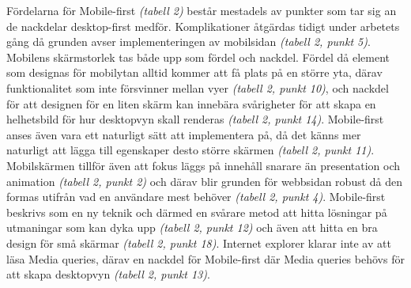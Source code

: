 \documentclass[11pt]{article}
\begin{document}
Fördelarna för Mobile-first \textit{(tabell 2)} består mestadels av punkter som tar sig an de nackdelar desktop-first medför. Komplikationer åtgärdas tidigt under arbetets gång då grunden avser implementeringen av mobilsidan \textit{(tabell 2, punkt 5)}. Mobilens skärmstorlek tas både upp som fördel och nackdel. Fördel då element som designas för mobilytan alltid kommer att få plats på en större yta, därav funktionalitet som inte försvinner mellan vyer \textit{(tabell 2, punkt 10)}, och nackdel för att designen för en liten skärm kan innebära svårigheter för att skapa en helhetsbild för hur desktopvyn skall renderas \textit{(tabell 2, punkt 14)}. Mobile-first anses även vara ett naturligt sätt att implementera på, då det känns mer naturligt att lägga till egenskaper desto större skärmen \textit{(tabell 2, punkt 11)}. Mobilskärmen tillför även att fokus läggs på innehåll snarare än presentation och animation \textit{(tabell 2, punkt 2)} och därav blir grunden för webbsidan robust då den formas utifrån vad en användare mest behöver \textit{(tabell 2, punkt 4)}. Mobile-first beskrivs som en ny teknik och därmed en svårare metod att hitta lösningar på utmaningar som kan dyka upp \textit{(tabell 2, punkt 12)} och även att hitta en bra design för små skärmar \textit{(tabell 2, punkt 18)}. Internet explorer klarar inte av att läsa Media queries, därav en nackdel för Mobile-first där Media queries behövs för att skapa desktopvyn \textit{(tabell 2, punkt 13)}.\\
\end{document}
